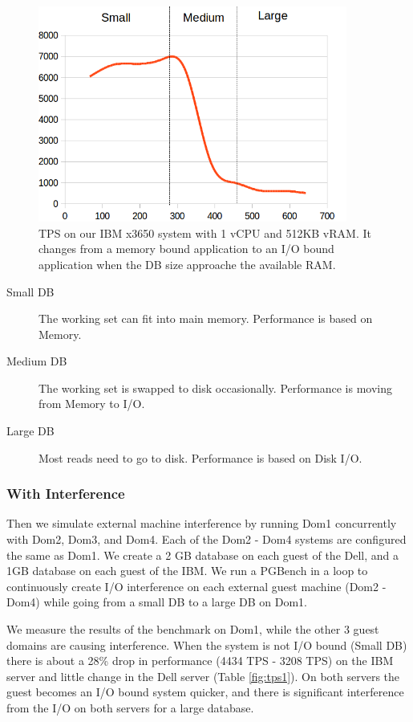 \begin{figure}[!h]
  \begin{center}
  \includegraphics[width=4in]{images/SmallScale.png}
  \caption{TPS on our IBM x3650 system with 1 vCPU and 512KB vRAM. It changes from a memory bound application to an I/O bound application when the DB size approache the available RAM.}
  \label{fig:smallIO}
  \end{center}
\end{figure}

\begin{description}
  \item[Small DB] The working set can fit into main memory.  Performance is based on Memory.
  \item[Medium DB] The working set is swapped to disk occasionally. Performance is moving from Memory to I/O.
  \item[Large DB] Most reads need to go to disk.  Performance is based on Disk I/O.
\end{description}

\subsubsection{With Interference}
Then we simulate external machine interference by running Dom1 concurrently with Dom2, Dom3, and Dom4. 
Each of the Dom2 - Dom4 systems are configured the same as Dom1.  
We create a 2 GB database on each guest of the Dell, and a 1GB database on each guest of the IBM.  
We run a PGBench in a loop to continuously create I/O interference on each external guest machine (Dom2 - Dom4) while going from a small DB to a large DB on Dom1.

We measure the results of the benchmark on Dom1, while the other 3 guest domains are causing interference.  
When the system is not I/O bound (Small DB) there is about a 28\% drop in performance (4434 TPS - 3208 TPS) on the IBM server and little change in the Dell server (Table \ref{fig:tps1}).  
On both servers the guest becomes an I/O bound system quicker,  and there is significant interference from the I/O on both servers for a large database.


